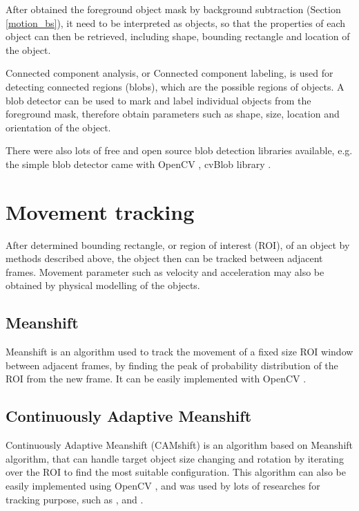 After obtained the foreground object mask by background subtraction (Section \ref{motion_bs}), it need to be interpreted as objects, so that the properties of each object can then be retrieved, including shape, bounding rectangle and location of the object.

Connected component analysis, or Connected component labeling, is used for detecting connected regions (blobs), which are the possible regions of objects. A blob detector can be used to mark and label individual objects from the foreground mask, therefore obtain parameters such as shape, size, location and orientation of the object.

There were also lots of free and open source blob detection libraries available, e.g. the simple blob detector came with OpenCV \cite{opencv:blob}, cvBlob library \cite{cvblob}.

\section{Movement tracking}
\label{bg:tracking}

After determined bounding rectangle, or region of interest (ROI), of an object by methods described above, the object then can be tracked between adjacent frames. Movement parameter such as velocity and acceleration may also be obtained by physical modelling of the objects.

\subsection{Meanshift}

Meanshift \cite{fukunaga2013introduction} is an algorithm used to track the movement of a fixed size ROI window between adjacent frames, by finding the peak of probability distribution of the ROI from the new frame. It can be easily implemented with OpenCV \cite{opencv:camshift}.

\subsection{Continuously Adaptive Meanshift}

Continuously Adaptive Meanshift (CAMshift) \cite{bradski1998computer} is an algorithm based on Meanshift algorithm, that can handle target object size changing and rotation by iterating over the ROI to find the most suitable configuration. This algorithm can also be easily implemented using OpenCV \cite{opencv:camshift}, and was used by lots of researches for tracking purpose, such as \cite{chu2007object}, \cite{xu2012moving} and \cite{nouar2006improved}.

